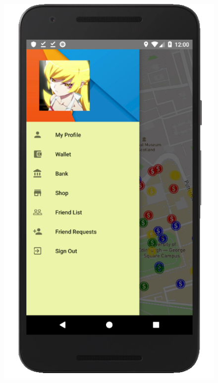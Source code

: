 \documentclass[12pt]{article}
\begin{document}
\begin{figure}
	\includegraphics[scale=0.25]{NaviDrawer.png}

\end{figure}
\end{document}
